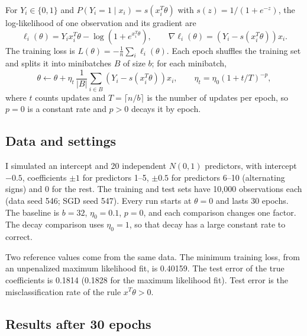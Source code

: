 \documentclass[11pt]{article}
\begin{document}
For $Y_i\in\{0,1\}$ and $P(Y_i=1\mid x_i)=s(x_i^T\theta)$ with $s(z)=1/(1+e^{-z})$, the log-likelihood of one
observation and its gradient are
\[
\ell_i(\theta)=Y_ix_i^T\theta-\log\left(1+e^{x_i^T\theta}\right),\qquad
\nabla\ell_i(\theta)=\left(Y_i-s(x_i^T\theta)\right)x_i .
\]
The training loss is $L(\theta)=-\frac1n\sum_i\ell_i(\theta)$. Each epoch shuffles the training set and splits it
into minibatches $B$ of size $b$; for each minibatch,
\[
\theta\leftarrow\theta+\eta_t\,\frac{1}{|B|}\sum_{i\in B}\left(Y_i-s(x_i^T\theta)\right)x_i ,
\qquad \eta_t=\eta_0\left(1+t/T\right)^{-p},
\]
where $t$ counts updates and $T=\lceil n/b\rceil$ is the number of updates per epoch, so $p=0$ is a constant
rate and $p>0$ decays it by epoch.

\subsection*{Data and settings}

I simulated an intercept and 20 independent $N(0,1)$ predictors, with intercept $-0.5$, coefficients
$\pm1$ for predictors 1--5, $\pm0.5$ for predictors 6--10 (alternating signs) and 0 for the rest. The training
and test sets have 10,000 observations each (data seed 546; SGD seed 547). Every run starts at $\theta=0$ and
lasts 30 epochs. The baseline is $b=32$, $\eta_0=0.1$, $p=0$, and each comparison changes one factor. The
decay comparison uses $\eta_0=1$, so that decay has a large constant rate to correct.

Two reference values come from the same data. The minimum training loss, from an unpenalized maximum
likelihood fit, is 0.40159. The test error of the true coefficients is 0.1814 (0.1828 for the maximum
likelihood fit). Test error is the misclassification rate of the rule $x^T\theta>0$.

\subsection*{Results after 30 epochs}
\end{document}
